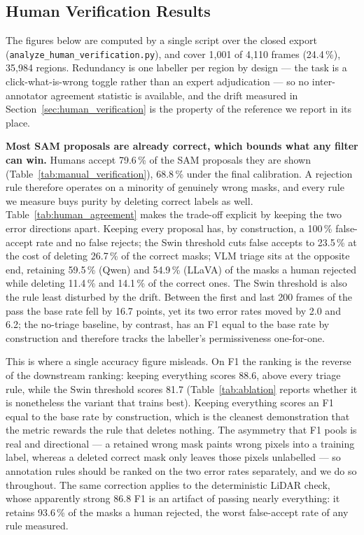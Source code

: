 \documentclass[conference]{IEEEtran}
\newcommand{\humancoverage}{1{,}001 of 4{,}110 frames (24.4\,\%), 35{,}984 regions}
\begin{document}
\subsection{Human Verification Results}
\label{sec:human_results}

The figures below are computed by a single script over the closed export
(\texttt{analyze\_human\_verification.py}), and cover \humancoverage.
Redundancy is one labeller per region by design --- the task is a click-what-is-wrong toggle rather
than an expert adjudication --- so no inter-annotator agreement statistic is available, and the
drift measured in Section~\ref{sec:human_verification} is the property of the reference we report in
its place.

\textbf{Most SAM proposals are already correct, which bounds what any filter can win.}
Humans accept 79.6\,\% of the SAM proposals they are shown (Table~\ref{tab:manual_verification}),
68.8\,\% under the final calibration.
A rejection rule therefore operates on a minority of genuinely wrong masks, and every
rule we measure buys purity by deleting correct labels as well. Table~\ref{tab:human_agreement} makes
the trade-off explicit by keeping the two error directions apart. Keeping every proposal has, by
construction, a 100\,\% false-accept rate and no false rejects; the Swin threshold cuts false
accepts to 23.5\,\% at the cost of deleting 26.7\,\% of the correct masks; VLM triage
sits at the opposite end, retaining 59.5\,\% (Qwen) and 54.9\,\% (LLaVA) of the masks a
human rejected while deleting 11.4\,\% and 14.1\,\% of the correct ones.
The Swin threshold is also the rule least disturbed by the drift. Between the first and last 200 frames
of the pass the base rate fell by 16.7 points, yet its two error rates moved by 2.0 and 6.2; the
no-triage baseline, by contrast, has an F1 equal to the base rate by construction and therefore tracks
the labeller's permissiveness one-for-one.

This is where a single accuracy figure misleads. On F1 the ranking is the reverse of the downstream
ranking: keeping everything scores 88.6, above every triage rule, while the Swin threshold
scores 81.7 (Table~\ref{tab:ablation} reports whether it is nonetheless the variant that trains best).
Keeping everything scores an F1 equal to the base rate by construction, which is the cleanest
demonstration that the metric rewards the rule that deletes nothing.
The asymmetry that F1 pools is real and directional --- a retained wrong mask paints wrong pixels into
a training label, whereas a deleted correct mask only leaves those pixels unlabelled --- so annotation
rules should be ranked on the two error rates separately, and we do so throughout.
The same correction applies to the deterministic LiDAR check, whose apparently strong
86.8 F1 is an artifact of passing nearly everything: it retains 93.6\,\% of the masks a
human rejected, the worst false-accept rate of any rule measured.
\end{document}
